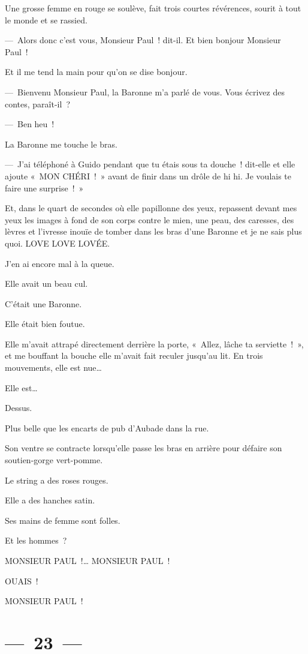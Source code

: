 \documentclass[twoside]{book} %
\begin{document}
Une grosse femme en rouge se soulève, fait trois courtes révérences, sourit à tout le monde et se rassied.\par
— Alors donc c’est vous, Monsieur Paul ! dit-il. Et bien bonjour Monsieur Paul !\par
Et il me tend la main pour qu’on se dise bonjour.\par
— Bienvenu Monsieur Paul, la Baronne m’a parlé de vous. Vous écrivez des contes, paraît-il ?\par
— Ben heu !\par
La Baronne me touche le bras.\par
— J’ai téléphoné à Guido pendant que tu étais sous ta douche ! dit-elle et elle ajoute « MON CHÉRI ! » avant de finir dans un drôle de hi hi. Je voulais te faire une surprise ! »\par
Et, dans le quart de secondes où elle papillonne des yeux, repassent devant mes yeux les images à fond de son corps contre le mien, une peau, des caresses, des lèvres et l’ivresse inouïe de tomber dans les bras d’une Baronne et je ne sais plus quoi. LOVE LOVE LOVÉE.\par
J’en ai encore mal à la queue.\par
Elle avait un beau cul.\par
C’était une Baronne.\par
Elle était bien foutue.\par
Elle m’avait attrapé directement derrière la porte, « Allez, lâche ta serviette ! », et me bouffant la bouche elle m’avait fait reculer jusqu’au lit. En trois mouvements, elle est nue…\par
Elle est…\par
Dessus.\par
Plus belle que les encarts de pub d’Aubade dans la rue.\par
Son ventre se contracte lorsqu’elle passe les bras en arrière pour défaire son soutien-gorge vert-pomme.\par
Le string a des roses rouges.\par
Elle a des hanches satin.\par
Ses mains de femme sont folles.\par
Et les hommes ?\par
MONSIEUR PAUL !… MONSIEUR PAUL !\par
OUAIS !\par
MONSIEUR PAUL !

\section[{— 23 —}]{— 23 —}
\renewcommand{\leftmark}{— 23 —}
\end{document}
